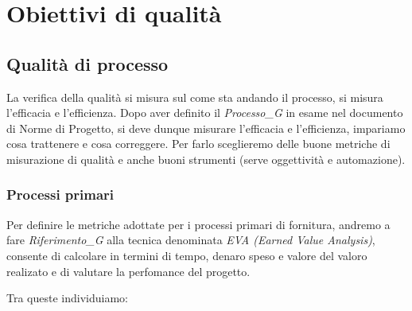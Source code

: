 \section{Obiettivi di qualità}

\subsection{Qualità di processo}
La verifica della qualità si misura sul come sta andando il processo, si misura l'efficacia e l'efficienza.
Dopo aver definito il \textit{Processo_G} in esame nel documento di Norme di Progetto, si deve dunque misurare l'efficacia e l'efficienza, impariamo cosa trattenere e cosa correggere. Per farlo sceglieremo delle buone metriche di misurazione di qualità e anche buoni strumenti (serve oggettività e automazione).

\subsubsection{Processi primari}
Per definire le metriche adottate per i processi primari di fornitura, andremo a fare \textit{Riferimento_G} alla tecnica denominata \emph{EVA (Earned Value Analysis)}, consente di calcolare in termini di tempo, denaro speso e valore del valoro realizato e di valutare la perfomance del progetto.

Tra queste individuiamo:

